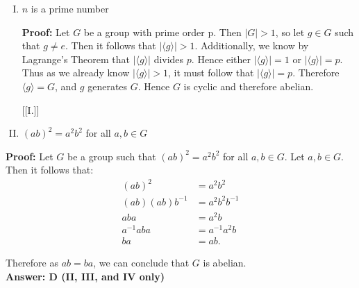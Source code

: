 \documentclass{article}
\newcommand\Proof{%
	\textbf{Proof:} %
}
\begin{document}
\begin{enumerate}[I.]
\Proof Let $G$ be a group with order $n=15$. Since $n=15=3 \cdot 5$, and both 3 and 5 are prime, we know that Sylow 3-subgroups of $G$ and Sylow-5 subgroups of $G$ exist by part (1) of Sylow's Theorem. Now by part (3) of Sylow's Theorem, we know that $n_3 \equiv 1 $(mod $ 3)$ and $n_3 \mid 5$. Thus as 5 is prime it must follow that $n_3=1$. Following the same reasoning, we can see that $n_5=1$. Let $P$ be the Sylow 3-subgroup in G and let Q be the Sylow 5-subgroup in G. Recall that $P \cap Q$ is a subgroup of $Q$ and $P$. Thus by Lagrange's Theorem, we know that $|P \cap Q|$ divides 3 and 5, so it follows that $|P \cap Q|=1$. That is, $P \cap Q=\{e\}$. Now consider the elements $a \in P$ and $b \in Q$. Now notice that $ab \notin P$ and $ab \notin Q$, and furthermore that $|\langle ab\rangle|$ must divide 15 by Lagrange's Theorem. Hence $|\langle ab \rangle|$ must be 1, 3, 5, or 15. Obviously $|\langle ab \rangle| \neq 1$ because this would imply $ab=e$, and further that $ab \in P \cap Q$, a contradiction. Also, $|\langle ab \rangle|$ cannot be 3, as this would imply that $\langle ab \rangle$ is a Sylow 3-subgroup of G, and moreover as $n_3=1$, $\langle ab \rangle = P$, which contradicts $ab \notin P$. For the same reasoning, we can conclude that $|\langle ab \rangle| \neq 5$. Therefore $|\langle ab \rangle|=15$, which means that $ab$ generates the entire group $G$. Hence $G$ is cyclic and therefore also abelian.  


[{[I.]}]
\item $n$ is a prime number

\Proof Let $G$ be a group with prime order p. Then $|G|>1$, so let $g \in G$ such that $g \neq e$. Then it follows that $|\langle g \rangle|>1$. Additionally, we know by Lagrange's Theorem that $|\langle g \rangle|$ divides $p$. Hence either $|\langle g \rangle|=1$ or $|\langle g \rangle|=p$. Thus as we already know $|\langle g \rangle|>1$, it must follow that $|\langle g \rangle|=p$. Therefore $\langle g \rangle=G$, and $g$ generates $G$. Hence $G$ is cyclic and therefore abelian.

[{[I.]}]
\item $(ab)^2=a^2b^2$ for all $a,b \in G$

\end{enumerate}

\Proof Let $G$ be a group such that $(ab)^2=a^2b^2$ for all $a,b \in G$. Let $a,b \in G$. Then it follows that:
\[
	\begin{split}
	(ab)^2&=a^2b^2\\
	(ab)(ab)b^{-1}&=a^2b^2b^{-1}\\
	aba&=a^2b\\
	a^{-1}aba&=a^{-1}a^2b\\
	ba&=ab.
	\end{split}
\]

Therefore as $ab=ba$, we can conclude that $G$ is abelian.\\

\textbf{Answer: D (II, III, and IV only)}
\end{document}
